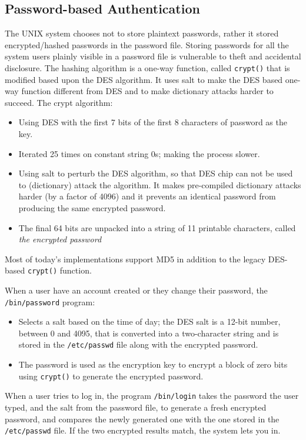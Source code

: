 \documentclass{article}
\begin{document}
\subsection{Password-based Authentication}
The UNIX system chooses not to store plaintext passwords, rather it stored encrypted/hashed passwords in the password file. Storing passwords for all the system users plainly visible in a password file is vulnerable to theft and accidental disclosure. The hashing algorithm is a one-way function, called \texttt{crypt()} that is modified based upon the DES algorithm. It uses salt to make the DES based one-way function different from DES and to make dictionary attacks harder to succeed. The crypt algorithm:
\begin{itemize}
  \item Using DES with the first 7 bits of the first 8 characters of password as the key.
  \item Iterated 25 times on constant string 0s; making the process slower.
  \item Using salt to perturb the DES algorithm, so that DES chip can not be used to (dictionary) attack the algorithm. It makes pre-compiled dictionary attacks harder (by a factor of 4096) and it prevents an identical password from producing the same encrypted password.
  \item The final 64 bits are unpacked into a string of 11 printable characters, called \textit{the encrypted password}
\end{itemize}
Most of today's implementations support MD5 in addition to the legacy DES-based \texttt{crypt()} function.

When a user have an account created or they change their password, the \texttt{/bin/password} program:
\begin{itemize}
  \item Selects a salt based on the time of day; the DES salt is a 12-bit number, between 0 and 4095, that is converted into a two-character string and is stored in the \texttt{/etc/passwd} file along with the encrypted password.
  \item The password is used as the encryption key to encrypt a block of zero bits using \texttt{crypt()} to generate the encrypted password.
\end{itemize}
When a user tries to log in, the program \texttt{/bin/login} takes the password the user typed, and the salt from the password file, to generate a fresh encrypted password, and compares the newly generated one with the one stored in the \texttt{/etc/passwd} file. If the two encrypted results match, the system lets you in.
\end{document}
